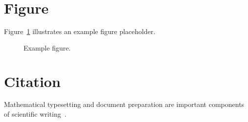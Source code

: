 \documentclass{../class/twocolpaper}
\begin{document}
\section{Figure}

Figure~\ref{fig:example} illustrates an example figure
placeholder.

\begin{figure}[htbp]
    \centering
    \fbox{\rule{0pt}{40mm}\rule{0.85\columnwidth}{0pt}}
    \caption{Example figure.}
    \label{fig:example}
\end{figure}


\section{Citation}

Mathematical typesetting and document preparation are important
components of scientific writing~\cite{lamport1994}.



\end{document}

